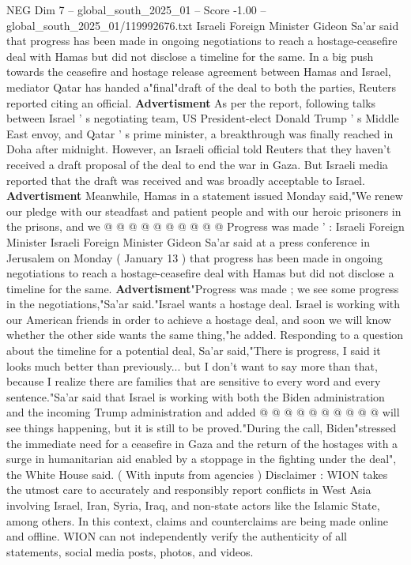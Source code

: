 \begin{textsample}{NEG Dim 7 – global\_south\_2025\_01 – Score -1.00 – global\_south\_2025\_01/119992676.txt}  \label{ex:f7_neg_113}
Israeli Foreign Minister Gideon Sa'ar said that progress has been made in ongoing negotiations to reach a hostage-ceasefire deal with Hamas but did not disclose a timeline for the same.
In a big push towards the ceasefire and hostage release agreement between Hamas and Israel, mediator Qatar has handed a"final"draft of the deal to both the parties, Reuters reported citing an official. \textbf{Advertisment} As per the report, following talks between Israel ' s negotiating team, US President-elect Donald Trump ' s Middle East envoy, and Qatar ' s prime minister, a breakthrough was finally reached in Doha after midnight.
However, an Israeli official told Reuters that they haven't received a draft proposal of the deal to end the war in Gaza.
But Israeli media reported that the draft was received and was broadly acceptable to Israel. \textbf{Advertisment} Meanwhile, Hamas in a statement issued Monday said,"We renew our pledge with our steadfast and patient people and with our heroic prisoners in the prisons, and we @ @ @ @ @ @ @ @ @ @ Progress was made ' : Israeli Foreign Minister Israeli Foreign Minister Gideon Sa'ar said at a press conference in Jerusalem on Monday ( January 13 ) that progress has been made in ongoing negotiations to reach a hostage-ceasefire deal with Hamas but did not disclose a timeline for the same. \textbf{Advertisment}"Progress was made ; we see some progress in the negotiations,"Sa'ar said."Israel wants a hostage deal.
Israel is working with our American friends in order to achieve a hostage deal, and soon we will know whether the other side wants the same thing,"he added.
Responding to a question about the timeline for a potential deal, Sa'ar said,"There is progress, I said it looks much better than previously... but I don't want to say more than that, because I realize there are families that are sensitive to every word and every sentence."Sa'ar said that Israel is working with both the Biden administration and the incoming Trump administration and added @ @ @ @ @ @ @ @ @ @ will see things happening, but it is still to be proved."During the call, Biden"stressed the immediate need for a ceasefire in Gaza and the return of the hostages with a surge in humanitarian aid enabled by a stoppage in the fighting under the deal", the White House said. ( With inputs from agencies ) Disclaimer : WION takes the utmost care to accurately and responsibly report conflicts in West Asia involving Israel, Iran, Syria, Iraq, and non-state actors like the Islamic State, among others.
In this context, claims and counterclaims are being made online and offline.
WION can not independently verify the authenticity of all statements, social media posts, photos, and videos.

\end{textsample}

